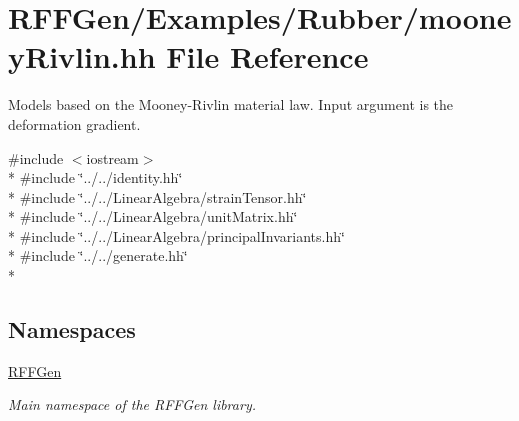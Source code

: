 \hypertarget{mooneyRivlin_8hh}{\section{R\-F\-F\-Gen/\-Examples/\-Rubber/mooney\-Rivlin.hh File Reference}
\label{mooneyRivlin_8hh}
}


Models based on the Mooney-\/\-Rivlin material law. Input argument is the deformation gradient.  


{\ttfamily \#include $<$iostream$>$}\\*
{\ttfamily \#include \char`\"{}../../identity.\-hh\char`\"{}}\\*
{\ttfamily \#include \char`\"{}../../\-Linear\-Algebra/strain\-Tensor.\-hh\char`\"{}}\\*
{\ttfamily \#include \char`\"{}../../\-Linear\-Algebra/unit\-Matrix.\-hh\char`\"{}}\\*
{\ttfamily \#include \char`\"{}../../\-Linear\-Algebra/principal\-Invariants.\-hh\char`\"{}}\\*
{\ttfamily \#include \char`\"{}../../generate.\-hh\char`\"{}}\\*
\subsection*{Namespaces}
\begin{DoxyCompactItemize}
\item 
\hyperlink{namespaceRFFGen}{R\-F\-F\-Gen}
\begin{DoxyCompactList}\small\item\em Main namespace of the R\-F\-F\-Gen library. \end{DoxyCompactList}\end{DoxyCompactItemize}
